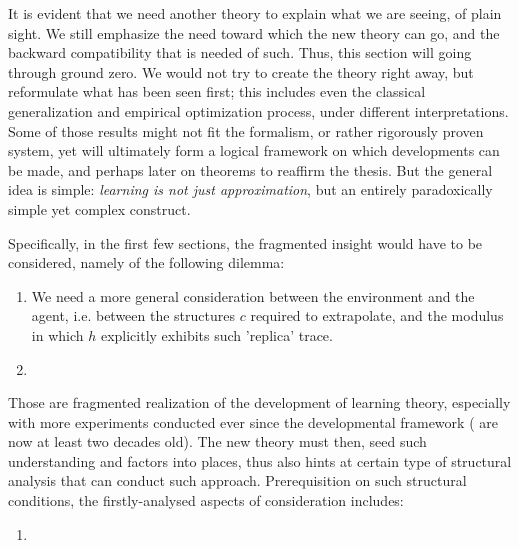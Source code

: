 \documentclass[
  journal=largetwo,
  year=2025,
  volume=37,
]{cup-journal}
\begin{document}
It is evident that we need another theory to explain what we are seeing, of plain sight. We still emphasize the need toward which the new theory can go, and the backward compatibility that is needed of such. Thus, this section will going through ground zero. We would not try to create the theory right away, but reformulate what has been seen first; this includes even the classical generalization and empirical optimization process, under different interpretations. Some of those results might not fit the formalism, or rather rigorously proven system, yet will ultimately form a logical framework on which developments can be made, and perhaps later on theorems to reaffirm the thesis. But the general idea is simple: \textit{learning is not just approximation}, but an entirely paradoxically simple yet complex construct. 

Specifically, in the first few sections, the fragmented insight would have to be considered, namely of the following dilemma: 

\begin{enumerate}
    \item We need a more general consideration between the environment and the agent, i.e. between the structures $c$ required to extrapolate, and the modulus in which $h$ explicitly exhibits such 'replica' trace. 
    \item 
\end{enumerate}

Those are fragmented realization of the development of learning theory, especially with more experiments conducted ever since the developmental framework (\cite{Vapnik1999-VAPTNO,10.1145/1968.1972} are now at least two decades old). The new theory must then, seed such understanding and factors into places, thus also hints at certain type of structural analysis that can conduct such approach. Prerequisition on such structural conditions, the firstly-analysed aspects of consideration includes:

\begin{enumerate}
    \item 
\end{enumerate}
\end{document}
